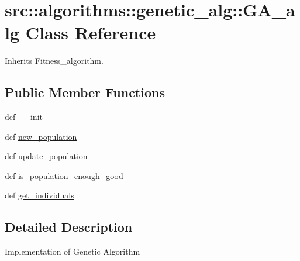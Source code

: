 \hypertarget{classsrc_1_1algorithms_1_1genetic__alg_1_1GA__alg}{
\section{src::algorithms::genetic\_\-alg::GA\_\-alg Class Reference}
\label{classsrc_1_1algorithms_1_1genetic__alg_1_1GA__alg}
}


Inherits Fitness\_\-algorithm.

\subsection*{Public Member Functions}
\begin{DoxyCompactItemize}
\item 
def \hyperlink{classsrc_1_1algorithms_1_1genetic__alg_1_1GA__alg_ac75b22769f0a6c43cf1716dd0b25cfa5}{\_\-\_\-init\_\-\_\-}
\item 
def \hyperlink{classsrc_1_1algorithms_1_1genetic__alg_1_1GA__alg_ac786fc0d2a7f70e105ab7fb81ce6e199}{new\_\-population}
\item 
def \hyperlink{classsrc_1_1algorithms_1_1genetic__alg_1_1GA__alg_a1ef66945d1b66e1e110af4d23389bd4a}{update\_\-population}
\item 
def \hyperlink{classsrc_1_1algorithms_1_1genetic__alg_1_1GA__alg_a700792357bb85eb126243459f8ba6d69}{is\_\-population\_\-enough\_\-good}
\item 
def \hyperlink{classsrc_1_1algorithms_1_1genetic__alg_1_1GA__alg_a47b1771393cfe8341825ffbc507cb0a8}{get\_\-individuals}
\end{DoxyCompactItemize}


\subsection{Detailed Description}
\begin{DoxyVerb}
Implementation of Genetic Algorithm
\end{DoxyVerb}
 

